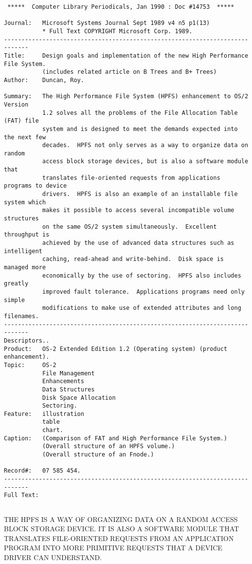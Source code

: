  
\begin{verbatim}
 *****  Computer Library Periodicals, Jan 1990 : Doc #14753  *****
 
Journal:   Microsoft Systems Journal Sept 1989 v4 n5 p1(13)
           * Full Text COPYRIGHT Microsoft Corp. 1989.
-----------------------------------------------------------------------------
Title:     Design goals and implementation of the new High Performance File System.
           (includes related article on B Trees and B+ Trees)
Author:    Duncan, Roy.
 
Summary:   The High Performance File System (HPFS) enhancement to OS/2 Version
           1.2 solves all the problems of the File Allocation Table (FAT) file
           system and is designed to meet the demands expected into the next few
           decades.  HPFS not only serves as a way to organize data on random
           access block storage devices, but is also a software module that
           translates file-oriented requests from applications programs to device
           drivers.  HPFS is also an example of an installable file system which
           makes it possible to access several incompatible volume structures
           on the same OS/2 system simultaneously.  Excellent throughput is
           achieved by the use of advanced data structures such as intelligent
           caching, read-ahead and write-behind.  Disk space is managed more
           economically by the use of sectoring.  HPFS also includes greatly
           improved fault tolerance.  Applications programs need only simple
           modifications to make use of extended attributes and long filenames.
-----------------------------------------------------------------------------
Descriptors..
Product:   OS-2 Extended Edition 1.2 (Operating system) (product enhancement).
Topic:     OS-2
           File Management
           Enhancements
           Data Structures
           Disk Space Allocation
           Sectoring.
Feature:   illustration
           table
           chart.
Caption:   (Comparison of FAT and High Performance File System.)
           (Overall structure of an HPFS volume.)
           (Overall structure of an Fnode.)
 
Record#:   07 585 454.
-----------------------------------------------------------------------------
Full Text:
 
\end{verbatim}
\noindent
{\sf THE HPFS IS A WAY OF ORGANIZING DATA ON A RANDOM ACCESS BLOCK STORAGE
DEVICE.
IT IS ALSO A SOFTWARE MODULE THAT TRANSLATES FILE-ORIENTED REQUESTS FROM AN
APPLICATION PROGRAM INTO MORE PRIMITIVE REQUESTS THAT A DEVICE DRIVER CAN
UNDERSTAND.}
 
